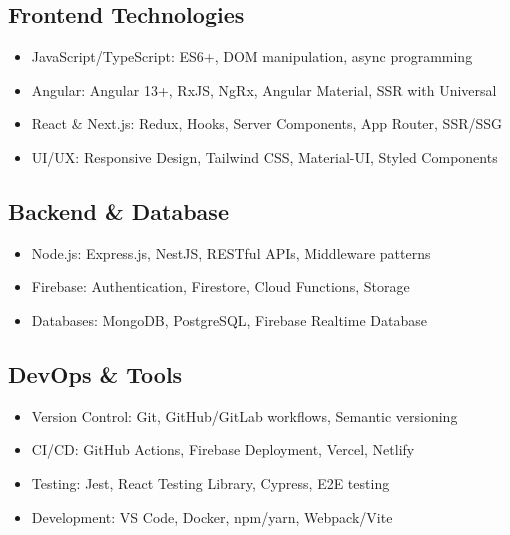 \documentclass[11pt,a4paper]{article}
\begin{document}
\subsection{Frontend Technologies}
\begin{itemize}
    \item JavaScript/TypeScript: ES6+, DOM manipulation, async programming
    \item Angular: Angular 13+, RxJS, NgRx, Angular Material, SSR with Universal
    \item React \& Next.js: Redux, Hooks, Server Components, App Router, SSR/SSG
    \item UI/UX: Responsive Design, Tailwind CSS, Material-UI, Styled Components
\end{itemize}

\subsection{Backend \& Database}
\begin{itemize}
    \item Node.js: Express.js, NestJS, RESTful APIs, Middleware patterns
    \item Firebase: Authentication, Firestore, Cloud Functions, Storage
    \item Databases: MongoDB, PostgreSQL, Firebase Realtime Database
\end{itemize}

\subsection{DevOps \& Tools}
\begin{itemize}
    \item Version Control: Git, GitHub/GitLab workflows, Semantic versioning
    \item CI/CD: GitHub Actions, Firebase Deployment, Vercel, Netlify
    \item Testing: Jest, React Testing Library, Cypress, E2E testing
    \item Development: VS Code, Docker, npm/yarn, Webpack/Vite
\end{itemize}
\end{document}
